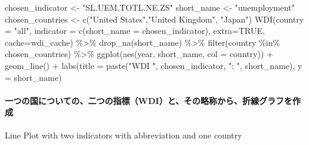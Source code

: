 \documentclass[
]{bxjsbook}
\newenvironment{Shaded}{\begin{snugshade}}{\end{snugshade}}
\newcommand{\AttributeTok}[1]{\textcolor[rgb]{0.77,0.63,0.00}{#1}}
\newcommand{\ConstantTok}[1]{\textcolor[rgb]{0.00,0.00,0.00}{#1}}
\newcommand{\FunctionTok}[1]{\textcolor[rgb]{0.00,0.00,0.00}{#1}}
\newcommand{\NormalTok}[1]{#1}
\newcommand{\OtherTok}[1]{\textcolor[rgb]{0.56,0.35,0.01}{#1}}
\newcommand{\SpecialCharTok}[1]{\textcolor[rgb]{0.00,0.00,0.00}{#1}}
\newcommand{\StringTok}[1]{\textcolor[rgb]{0.31,0.60,0.02}{#1}}
\theoremstyle{definition}
\theoremstyle{definition}
\theoremstyle{definition}
\theoremstyle{definition}
\theoremstyle{remark}
\begin{document}
\begin{Shaded}
\begin{Highlighting}[]
\NormalTok{chosen\_indicator }\OtherTok{\textless{}{-}} \StringTok{"SL.UEM.TOTL.NE.ZS"}
\NormalTok{short\_name }\OtherTok{\textless{}{-}} \StringTok{"unemployment"}
\NormalTok{chosen\_countries }\OtherTok{\textless{}{-}} \FunctionTok{c}\NormalTok{(}\StringTok{"United States"}\NormalTok{,}\StringTok{"United Kingdom"}\NormalTok{, }\StringTok{"Japan"}\NormalTok{)}
\FunctionTok{WDI}\NormalTok{(}\AttributeTok{country =} \StringTok{"all"}\NormalTok{, }\AttributeTok{indicator =} \FunctionTok{c}\NormalTok{(}\AttributeTok{short\_name =}\NormalTok{ chosen\_indicator), }\AttributeTok{extra=}\ConstantTok{TRUE}\NormalTok{, }\AttributeTok{cache=}\NormalTok{wdi\_cache) }\SpecialCharTok{\%\textgreater{}\%} \FunctionTok{drop\_na}\NormalTok{(short\_name) }\SpecialCharTok{\%\textgreater{}\%} 
  \FunctionTok{filter}\NormalTok{(country }\SpecialCharTok{\%in\%}\NormalTok{ chosen\_countries) }\SpecialCharTok{\%\textgreater{}\%} 
  \FunctionTok{ggplot}\NormalTok{(}\FunctionTok{aes}\NormalTok{(year, short\_name, }\AttributeTok{col =}\NormalTok{ country)) }\SpecialCharTok{+} \FunctionTok{geom\_line}\NormalTok{() }\SpecialCharTok{+}
  \FunctionTok{labs}\NormalTok{(}\AttributeTok{title =} \FunctionTok{paste}\NormalTok{(}\StringTok{"WDI "}\NormalTok{, chosen\_indicator, }\StringTok{": "}\NormalTok{, short\_name), }\AttributeTok{y =}\NormalTok{ short\_name)}
\end{Highlighting}
\end{Shaded}

\hypertarget{ux4e00ux3064ux306eux56fdux306bux3064ux3044ux3066ux306eux4e8cux3064ux306eux6307ux6a19wdiux3068ux305dux306eux7565ux79f0ux304bux3089ux6298ux7ddaux30b0ux30e9ux30d5ux3092ux4f5cux6210}{%
\paragraph{一つの国についての、二つの指標（WDI）と、その略称から、折線グラフを作成}\label{ux4e00ux3064ux306eux56fdux306bux3064ux3044ux3066ux306eux4e8cux3064ux306eux6307ux6a19wdiux3068ux305dux306eux7565ux79f0ux304bux3089ux6298ux7ddaux30b0ux30e9ux30d5ux3092ux4f5cux6210}}

Line Plot with two indicators with abbreviation and one country
\end{document}
